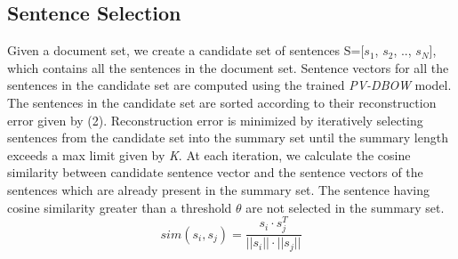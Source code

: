 \documentclass[11pt,a4paper]{article}
\begin{document}



\subsection{Sentence Selection}
 Given a document set, we create a candidate set of sentences S=[$s_1$, $s_2$, .., $s_N$], which contains all the sentences in the document set. Sentence vectors for all the sentences in the candidate set are computed using the trained \textit{PV-DBOW} model. 
The sentences in the candidate set are sorted according to their reconstruction error given by (2). Reconstruction error is minimized by iteratively selecting sentences from the candidate set into the summary set until the summary length exceeds a max limit given by \textit{K}. At each iteration, we calculate the cosine similarity between candidate sentence vector and the sentence vectors of the sentences which are already present in the summary set. The sentence having cosine similarity greater than a threshold $\theta$ are not selected in the summary set. 
\begin{equation}
 sim(s_i, s_j) = \frac{s_i \cdot{} s_j^T}{||s_i|| \cdot ||s_j|| }
\end{equation}

\end{document}
